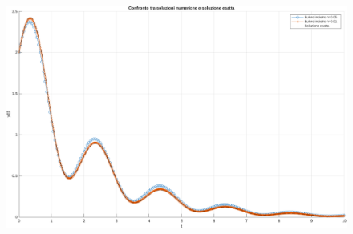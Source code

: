 \begin{enumerate}
    \begin{landscape}
        \begin{figure}[!htp]
            \centering
            \includegraphics[width=1.53\textwidth]{img/24-07-2025/confronto-soluzioni-eulero-indietro.pdf}
        \end{figure}
    \end{landscape}
\end{enumerate}
